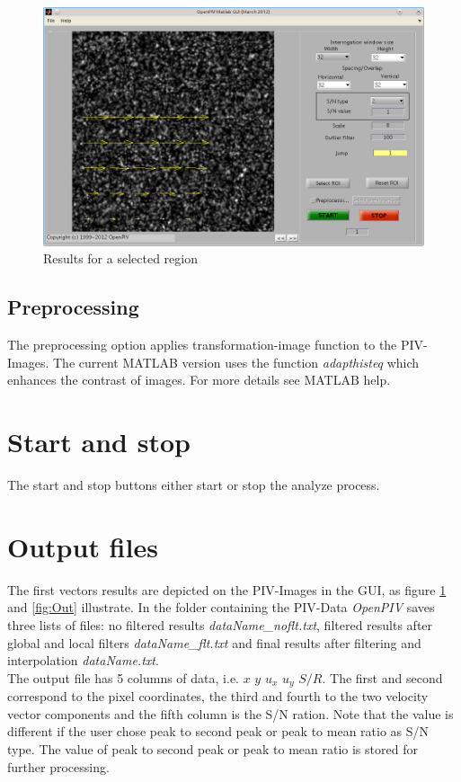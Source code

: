 \begin{figure}[H]
	\centering
	\includegraphics[width=\textwidth]{Images/ROI.png}
	\caption{Results for a selected region}
	\label{fig:ROI}
\end{figure}

\subsection{Preprocessing}\label{Preprocessing}
The preprocessing option applies transformation-image function to the PIV-Images. The current 
MATLAB version uses the function \emph{adapthisteq} which enhances the contrast of images. 
For more details see MATLAB help.

\section{Start and stop}\label{Start}
The start and stop buttons either start or stop the analyze process.

\section{Output files}\label{Output files}
The first vectors results are depicted on the PIV-Images in the GUI, as figure \ref{fig:ROI} and 
\ref{fig:Out} illustrate. In the folder containing the PIV-Data \emph{OpenPIV} saves three lists 
of files: no filtered results \emph{dataName\_noflt.txt}, filtered results after global and local 
filters \emph{dataName\_flt.txt} and final results after filtering and interpolation 
\emph{dataName.txt}.\\

The output file has 5 columns of data, i.e. $x$ $y$ $u_{x}$ $u_{y}$ $S/R$. The first and second 
correspond to the pixel coordinates, the third and fourth to the two velocity vector components 
and the fifth column is the S/N ration. Note that the value is different if the user chose peak 
to second peak or peak to mean ratio as S/N type. The value of peak to second peak or peak 
to mean ratio is stored for further processing.\\

